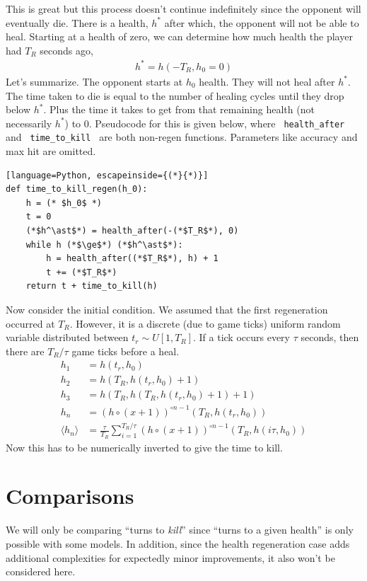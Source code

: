 			This is great but this process doesn't continue indefinitely since the opponent will eventually die. There is a health, $h^*$ after which, the opponent will not be able to heal. Starting at a health of zero, we can determine how much health the player had $T_R$ seconds ago,
			\begin{align}
				h^* = h(-T_R, h_0=0)
			\end{align}
			Let's summarize. The opponent starts at $h_0$ health. They will not heal after $h^*$. The time taken to die is equal to the number of healing cycles until they drop below $h^*$. Plus the time it takes to get from that remaining health (not necessarily $h^*$) to 0. Pseudocode for this is given below, where \verb| health_after | and \verb| time_to_kill | are both non-regen functions. Parameters like accuracy and max hit are omitted.

			\begin{lstlisting}[language=Python, escapeinside={(*}{*)}]
def time_to_kill_regen(h_0):
	h = (* $h_0$ *)
	t = 0
	(*$h^\ast$*) = health_after(-(*$T_R$*), 0)
	while h (*$\ge$*) (*$h^\ast$*):
		h = health_after((*$T_R$*), h) + 1
		t += (*$T_R$*)
	return t + time_to_kill(h)
	\end{lstlisting}


			Now consider the initial condition. We assumed that the first regeneration occurred at $T_R$. However, it is a discrete (due to game ticks) uniform random variable distributed between $t_r \sim U[1, T_R]$. If a tick occurs every $\tau$ seconds, then there are $T_R/\tau$ game ticks before a heal.
			\begin{align}
				h_1 &= h(t_r, h_0) \\
				h_2 &= h(T_R, h(t_r, h_0) + 1) \\
				h_3 &= h(T_R, h(T_R, h(t_r, h_0) + 1) + 1) \\
				h_n &= (h\circ (x+1))^{\circ n-1}(T_R, h(t_r, h_0)) \\
				\langle h_n \rangle &= \frac{\tau}{T_R}\sum_{i=1}^{T_R/\tau} (h\circ (x+1))^{\circ n-1}(T_R, h(i\tau, h_0))
			\end{align}
			Now this has to be numerically inverted to give the time to kill.

		\section{Comparisons}
			We will only be comparing ``turns to \textit{kill}'' since ``turns to a given health'' is only possible with some models. In addition, since the health regeneration case adds additional complexities for expectedly minor improvements, it also won't be considered here.

